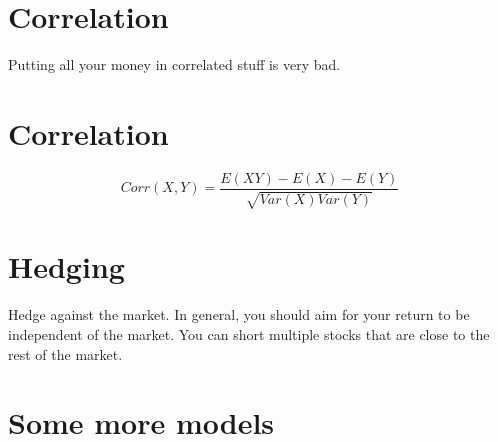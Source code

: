 \documentclass{article}
\begin{document}
\section{Correlation}
Putting all your money in correlated stuff is very bad.
\section{Correlation}
$$Corr(X,Y)=\frac{E(XY)-E(X)-E(Y)}{\sqrt{Var(X)Var(Y)}}$$
\section{Hedging}
Hedge against the market. In general, you should aim for your return to be independent of the market. You can short multiple stocks that are close to the rest of the market.
\section{Some more models}
\end{document}

